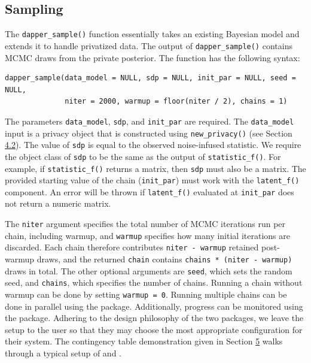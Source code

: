 \subsection{Sampling}\label{sec:sampler}

The \texttt{dapper\_sample()} function essentially takes an existing
Bayesian model and extends it to handle privatized data. The
output of \texttt{dapper\_sample()} contains MCMC draws from
the private posterior. The function has the following syntax:

\begin{verbatim}
dapper_sample(data_model = NULL, sdp = NULL, init_par = NULL, seed = NULL,
              niter = 2000, warmup = floor(niter / 2), chains = 1)
\end{verbatim}

The parameters \texttt{data\_model}, \texttt{sdp}, and \texttt{init\_par} are required.
The \texttt{data\_model} input is a privacy object that is constructed
using \texttt{new\_privacy()} (see Section \hyperref[sec:privacy_model]{4.2}). The value
of \texttt{sdp} is equal to the observed noise-infused statistic. We require the
object class of \texttt{sdp} to be the same as the output of \texttt{statistic\_f()}.
For example, if \texttt{statistic\_f()} returns a matrix,
then \texttt{sdp} must also be a matrix. The provided starting value of the
chain (\texttt{init\_par}) must work with the \texttt{latent\_f()} component. An
error will be thrown if \texttt{latent\_f()} evaluated at \texttt{init\_par} does
not return a numeric matrix.

The \texttt{niter} argument specifies the total number of MCMC iterations run per
chain, including warmup, and \texttt{warmup} specifies how many initial iterations
are discarded. Each chain therefore contributes \texttt{niter\ -\ warmup} retained
post-warmup draws, and the returned \texttt{chain} contains
\texttt{chains\ *\ (niter\ -\ warmup)} draws in total. The other optional arguments are
\texttt{seed}, which sets the random seed, and \texttt{chains}, which specifies the number
of chains. Running a chain without warmup can be done by setting \texttt{warmup\ =\ 0}.
Running multiple chains can be done in parallel
using the  \citep{furrr_pkg} package. Additionally, progress can be monitored
using the  \citep{progressr_pkg} package. Adhering to the design philosophy
of the two packages, we leave the setup to the user so that they may
choose the most appropriate configuration for their system. The
contingency table demonstration given in Section \hyperref[sec:examples]{5} walks
through a typical setup of  and .

